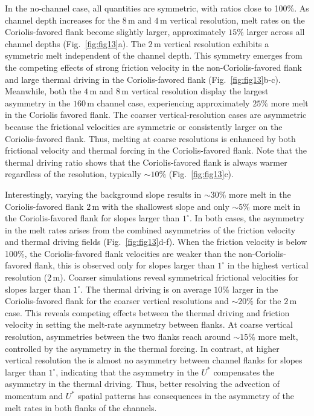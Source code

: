 \documentclass[draft]{agujournal2019}
\begin{document}
In the no‑channel case, all quantities are symmetric, with ratios close to 100\%. As channel depth increases for the $8\,\mathrm{m}$ and $4\,\mathrm{m}$ vertical resolution, melt rates on the Coriolis‑favored flank become slightly larger, approximately $15\%$ larger across all channel depths (Fig.~\ref{fig:fig13}a). The $2\,\mathrm{m}$ vertical resolution exhibits a symmetric melt independent of the channel depth. This symmetry emerges from the competing effects of strong friction velocity in the non-Coriolis-favored flank and large thermal driving in the Coriolis-favored flank (Fig.~\ref{fig:fig13}b-c).
Meanwhile, both the $4\,\mathrm{m}$ and $8\,\mathrm{m}$ vertical resolution display the largest asymmetry in the $160\,\mathrm{m}$ channel case, experiencing approximately $25\%$ more melt in the Coriolis favored flank. The coarser vertical-resolution cases are asymmetric because the frictional velocities are symmetric or consistently larger on the Coriolis-favored flank. Thus, melting at coarse resolutions is enhanced by both frictional velocity and thermal forcing in the Coriolis-favored flank. Note that the thermal driving ratio shows that the Coriolis-favored flank is always warmer regardless of the resolution, typically $\sim10\%$ (Fig.~\ref{fig:fig13}c). 

Interestingly, varying the background slope results in $\sim30\%$ more melt in the Coriolis-favored flank $2\,\mathrm{m}$ with the shallowest slope and only $\sim5\%$ more melt in the Coriolis-favored flank for slopes larger than $1^\circ$. In both cases, the asymmetry in the melt rates arises from the combined asymmetries of the friction velocity and thermal driving fields (Fig.~\ref{fig:fig13}d-f). When the friction velocity is below 100\%, the Coriolis-favored flank velocities are weaker than the non-Coriolis-favored flank, this is observed only for slopes larger than $1^\circ$ in the highest vertical resolution ($2\,\mathrm{m}$). Coarser simulations reveal symmetrical frictional velocities for slopes larger than $1^\circ$. The thermal driving is on average $10$\% larger in the Coriolis-favored flank for the coarser vertical resolutions and $\sim20\%$ for the $2\,\mathrm{m}$ case. This reveals competing effects between the thermal driving and friction velocity in setting the melt-rate asymmetry between flanks. At coarse vertical resolution, asymmetries between the two flanks reach around $\sim15\%$ more melt, controlled by the asymmetry in the thermal forcing. In contrast, at higher vertical resolution the is almost no asymmetry between channel flanks for slopes larger than $1^\circ$, indicating that the asymmetry in the $U^*$  compensates the asymmetry in the thermal driving. Thus, better resolving the advection of momentum and $U^*$ spatial patterns has consequences in the asymmetry of the melt rates in both flanks of the channels.
\end{document}
